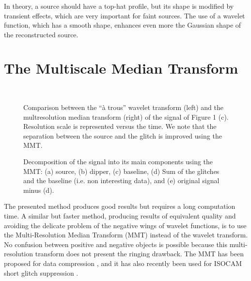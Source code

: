 In theory, a source should have a top-hat profile, but its shape is
modified by transient effects, which are very important for faint sources.
The use of a wavelet function, which has a smooth shape, 
enhances even more the Gaussian shape of the reconstructed source.

\clearpage
\newpage

\section{The Multiscale Median Transform}
\begin{figure}[htb] 
\centerline{
\hbox{
}}
\label{fig_cmp}
\caption{Comparison between   the ``\`a trous'' wavelet transform (left)
and the multresolution median transform (right) of the signal
of Figure 1 (c). Resolution scale is represented versus the time.
We note that the separation between the source and the glitch is
improved using the MMT.}
\end{figure}


\begin{figure}[htb]
\centerline{
\vbox{
}}
\caption{Decomposition of the signal into its main components using
the MMT: 
(a) source, (b)  dipper, (c)  baseline,
 (d) Sum of the glitches and the baseline (i.e. non interesting data),
and (e) original signal minus (d).}
\label{fig_glitch_mmt}
\end{figure}


The presented method produces good results but requires a long computation
time.  A similar but faster method, producing results of
equivalent quality and
avoiding the delicate problem of the negative wings of wavelet
functions, is to use the Multi-Resolution Median Transform (MMT)
\cite{starck:book98} instead of the wavelet transform.  No confusion
between positive and negative objects is possible because this
multi-resolution transform does not present the ringing drawback.  The
MMT has been proposed for data compression \cite{starck:sta96_2}, and
it has also recently been used for ISOCAM short glitch suppression
\cite{starck:sta99_1}.

